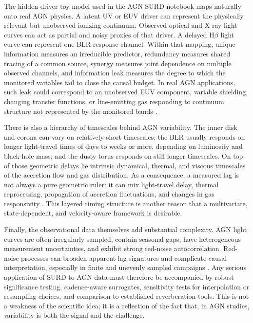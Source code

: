 \documentclass{article}
\begin{document}
The hidden-driver toy model used in the AGN SURD notebook maps naturally onto real AGN physics. A latent UV or EUV driver can represent the physically relevant but unobserved ionizing continuum. Observed optical and X-ray light curves can act as partial and noisy proxies of that driver. A delayed H$\beta$ light curve can represent one BLR response channel. Within that mapping, unique information measures an irreducible predictor, redundancy measures shared tracing of a common source, synergy measures joint dependence on multiple observed channels, and information leak measures the degree to which the monitored variables fail to close the causal budget. In real AGN applications, such leak could correspond to an unobserved EUV component, variable shielding, changing transfer functions, or line-emitting gas responding to continuum structure not represented by the monitored bands \cite{AGN_SURD_notebook,Cackett2021,Dehghanian2019}.

There is also a hierarchy of timescales behind AGN variability. The inner disk and corona can vary on relatively short timescales; the BLR usually responds on longer light-travel times of days to weeks or more, depending on luminosity and black-hole mass; and the dusty torus responds on still longer timescales. On top of those geometric delays lie intrinsic dynamical, thermal, and viscous timescales of the accretion flow and gas distribution. As a consequence, a measured lag is not always a pure geometric ruler: it can mix light-travel delay, thermal reprocessing, propagation of accretion fluctuations, and changes in gas responsivity \cite{Cackett2021,Peterson2006}. This layered timing structure is another reason that a multivariate, state-dependent, and velocity-aware framework is desirable.

Finally, the observational data themselves add substantial complexity. AGN light curves are often irregularly sampled, contain seasonal gaps, have heterogeneous measurement uncertainties, and exhibit strong red-noise autocorrelation. Red-noise processes can broaden apparent lag signatures and complicate causal interpretation, especially in finite and unevenly sampled campaigns \cite{Cackett2021}. Any serious application of SURD to AGN data must therefore be accompanied by robust significance testing, cadence-aware surrogates, sensitivity tests for interpolation or resampling choices, and comparison to established reverberation tools. This is not a weakness of the scientific idea; it is a reflection of the fact that, in AGN studies, variability is both the signal and the challenge.
\end{document}
